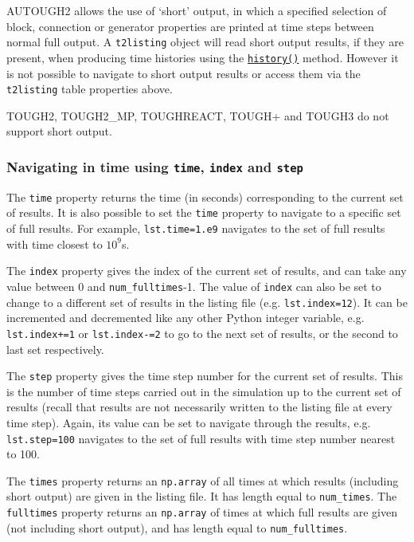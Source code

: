 AUTOUGH2 allows the use of `short' output, in which a specified selection of block, connection or generator properties are printed at time steps between normal full output.  A \texttt{t2listing} object will read short output results, if they are present, when producing time histories using the \hyperref[sec:t2listing:history]{\texttt{history()}} method.  However it is not possible to navigate to short output results or access them via the \texttt{t2listing} table properties above.

TOUGH2, TOUGH2\_MP, TOUGHREACT, TOUGH+ and TOUGH3 do not support short output.

\subsubsection{Navigating in time using \texttt{time}, \texttt{index} and \texttt{step}}

The \texttt{time} property returns the time (in seconds) corresponding to the current set of results.  It is also possible to set the \texttt{time} property to navigate to a specific set of full results.  For example, \texttt{lst.time=1.e9} navigates to the set of full results with time closest to $10^9$s.

The \texttt{index} property gives the index of the current set of results, and can take any value between 0 and \texttt{num\_fulltimes}-1.  The value of \texttt{index} can also be set to change to a different set of results in the listing file (e.g. \texttt{lst.index=12}).  It can be incremented and decremented like any other Python integer variable, e.g. \texttt{lst.index+=1} or \texttt{lst.index-=2} to go to the next set of results, or the second to last set respectively.

The \texttt{step} property gives the time step number for the current set of results.  This is the number of time steps carried out in the simulation up to the current set of results (recall that results are not necessarily written to the listing file at every time step).  Again, its value can be set to navigate through the results, e.g. \texttt{lst.step=100} navigates to the set of full results with time step number nearest to 100.

The \texttt{times} property returns an \texttt{np.array} of all times at which results (including short output) are given in the listing file.  It has length equal to \texttt{num\_times}.  The \texttt{fulltimes} property returns an \texttt{np.array} of times at which full results are given (not including short output), and has length equal to \texttt{num\_fulltimes}.

